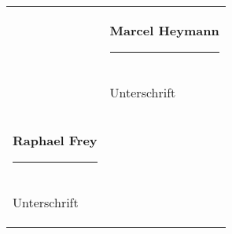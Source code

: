 \begin{tabular}{p{80mm}p{80mm}}
    &

    \parbox[t][][t]{55mm}{
        \textbf{Marcel Heymann}
        \vspace*{10mm} \\
        \rule{70mm}{0.05em} \\
        Unterschrift
    } \\
    [25mm]

    \parbox[t][][t]{55mm}{
        \textbf{Raphael Frey}
        \vspace*{10mm} \\
        \rule{70mm}{0.05em} \\
        Unterschrift
    }
\end{tabular}
